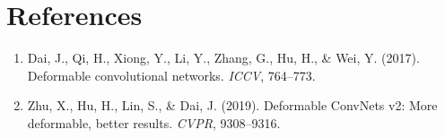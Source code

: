 \documentclass[11pt,a4paper]{article}
\theoremstyle{definition}
\begin{document}
\section{References}
\begin{enumerate}
    \item Dai, J., Qi, H., Xiong, Y., Li, Y., Zhang, G., Hu, H., \& Wei, Y. (2017). Deformable convolutional networks. \emph{ICCV}, 764--773.
    \item Zhu, X., Hu, H., Lin, S., \& Dai, J. (2019). Deformable ConvNets v2: More deformable, better results. \emph{CVPR}, 9308--9316.
\end{enumerate}
\end{document}
